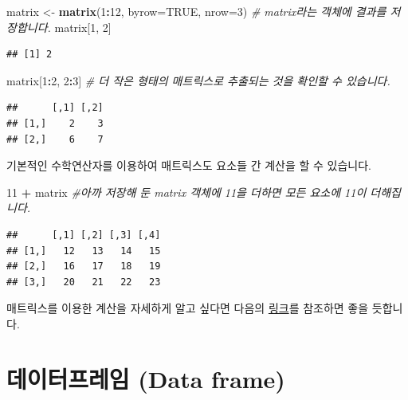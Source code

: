 \documentclass[]{book}
\newenvironment{Shaded}{\begin{snugshade}}{\end{snugshade}}
\newcommand{\CommentTok}[1]{\textcolor[rgb]{0.56,0.35,0.01}{\textit{#1}}}
\newcommand{\DataTypeTok}[1]{\textcolor[rgb]{0.13,0.29,0.53}{#1}}
\newcommand{\DecValTok}[1]{\textcolor[rgb]{0.00,0.00,0.81}{#1}}
\newcommand{\KeywordTok}[1]{\textcolor[rgb]{0.13,0.29,0.53}{\textbf{#1}}}
\newcommand{\NormalTok}[1]{#1}
\newcommand{\OperatorTok}[1]{\textcolor[rgb]{0.81,0.36,0.00}{\textbf{#1}}}
\newcommand{\OtherTok}[1]{\textcolor[rgb]{0.56,0.35,0.01}{#1}}
\newcommand{\StringTok}[1]{\textcolor[rgb]{0.31,0.60,0.02}{#1}}
\begin{document}
\begin{Shaded}
\begin{Highlighting}[]
\NormalTok{matrix <-}\StringTok{ }\KeywordTok{matrix}\NormalTok{(}\DecValTok{1}\OperatorTok{:}\DecValTok{12}\NormalTok{, }\DataTypeTok{byrow=}\OtherTok{TRUE}\NormalTok{, }\DataTypeTok{nrow=}\DecValTok{3}\NormalTok{) }\CommentTok{# matrix라는 객체에 결과를 저장합니다.}
\NormalTok{matrix[}\DecValTok{1}\NormalTok{, }\DecValTok{2}\NormalTok{]}
\end{Highlighting}
\end{Shaded}

\begin{verbatim}
## [1] 2
\end{verbatim}

\begin{Shaded}
\begin{Highlighting}[]
\NormalTok{matrix[}\DecValTok{1}\OperatorTok{:}\DecValTok{2}\NormalTok{, }\DecValTok{2}\OperatorTok{:}\DecValTok{3}\NormalTok{]  }\CommentTok{# 더 작은 형태의 매트릭스로 추출되는 것을 확인할 수 있습니다.}
\end{Highlighting}
\end{Shaded}

\begin{verbatim}
##      [,1] [,2]
## [1,]    2    3
## [2,]    6    7
\end{verbatim}

기본적인 수학연산자를 이용하여 매트릭스도 요소들 간 계산을 할 수 있습니다.

\begin{Shaded}
\begin{Highlighting}[]
\DecValTok{11} \OperatorTok{+}\StringTok{ }\NormalTok{matrix }\CommentTok{#아까 저장해 둔 matrix 객체에 11을 더하면 모든 요소에 11이 더해집니다.}
\end{Highlighting}
\end{Shaded}

\begin{verbatim}
##      [,1] [,2] [,3] [,4]
## [1,]   12   13   14   15
## [2,]   16   17   18   19
## [3,]   20   21   22   23
\end{verbatim}

매트릭스를 이용한 계산을 자세하게 알고 싶다면 다음의 \href{https://www.statmethods.net/advstats/matrix.html}{링크}를 참조하면 좋을 듯합니다.

\hypertarget{uxb370uxc774uxd130uxd504uxb808uxc784-data-frame}{%
\section{데이터프레임 (Data frame)}\label{uxb370uxc774uxd130uxd504uxb808uxc784-data-frame}}
\end{document}
